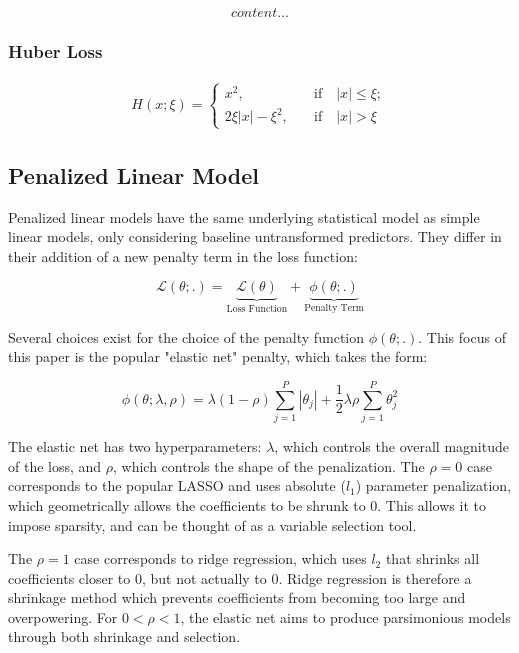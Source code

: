 \documentclass[man, a4paper, biblatex]{article}
\begin{document}
\begin{equation}
	content...
\end{equation}

\subsubsection{Huber Loss}

\begin{align}
	H(x;\xi) = 
	\begin{cases}
	x^2, 
	\quad &\text{if} \quad |x| \leq \xi ; \\
	2 \xi  |x| - \xi^2, 
	\quad &\text{if} \quad |x| > \xi
	\end{cases}
\end{align}

\subsection{Penalized Linear Model}

Penalized linear models have the same underlying statistical model as simple linear models, only considering baseline untransformed predictors. They differ in their addition of a new penalty term in the loss function:

\begin{equation}
	\mathcal{L(\theta;.)} = 
	\underset{\text{Loss Function}}{\underbrace{\mathcal{L(\theta)}}} + 
	\underset{\text{Penalty Term}}{\underbrace{\phi(\theta;.)}}
\end{equation}

Several choices exist for the choice of the penalty function \( \phi(\theta;.) \). This focus of this paper is the popular "elastic net" penalty, which takes the form:

\begin{equation}
	\phi(\theta;\lambda,\rho) = 
	\lambda(1-\rho) \sum_{j = 1}^{P}|\theta_j| +
	\frac{1}{2} \lambda \rho \sum_{j = 1}^{P}\theta_j^2
\end{equation}

The elastic net has two hyperparameters: $\lambda$, which controls the overall magnitude of the loss, and $\rho$, which controls the shape of the penalization. The $\rho = 0$ case corresponds to the popular LASSO and uses absolute ($l_1$) parameter penalization, which geometrically allows the coefficients to be shrunk to 0. This allows it to impose sparsity, and can be thought of as a variable selection tool.

The $\rho = 1$ case corresponds to ridge regression, which uses $l_2$ that shrinks all coefficients closer to 0, but not actually to 0. Ridge regression is therefore a shrinkage method which prevents coefficients from becoming too large and overpowering. For \(0 < \rho < 1\), the elastic net aims to produce parsimonious models through both shrinkage and selection.
\end{document}
